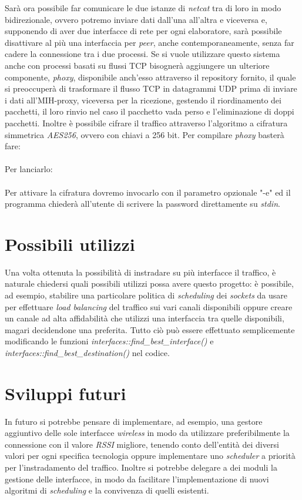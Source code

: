 Sarà ora possibile far comunicare le due istanze di {\em netcat} tra di loro in modo bidirezionale, ovvero potremo inviare dati dall'una all'altra e viceversa e, supponendo di aver due interfacce di rete per ogni elaboratore, sarà possibile disattivare al più una interfaccia per {\em peer}, anche contemporaneamente, senza far cadere la connessione tra i due processi. Se si vuole utilizzare questo sistema anche con processi basati su flussi TCP bisognerà aggiungere un ulteriore componente, {\em phoxy}, disponibile anch'esso attraverso il repository fornito, il quale si preoccuperà di trasformare il flusso TCP in datagrammi UDP prima di inviare i dati all'MIH-proxy, viceversa per la ricezione, gestendo il riordinamento dei pacchetti, il loro rinvio nel caso il pacchetto vada perso e l'eliminazione di doppi pacchetti. Inoltre è possibile cifrare il traffico attraverso l'algoritmo a cifratura simmetrica {\em AES256}, ovvero con chiavi a 256 bit. Per compilare {\em phoxy} basterà fare:\\
\\Per lanciarlo:\\
\\
Per attivare la cifratura dovremo invocarlo con il parametro opzionale "-e" ed il programma chiederà all'utente di scrivere la password direttamente su {\em stdin}.
\newpage
\section{Possibili utilizzi}
Una volta ottenuta la possibilità di instradare su più interfacce il traffico, è naturale chiedersi quali possibili utilizzi possa avere questo progetto:
è possibile, ad esempio, stabilire una particolare politica di {\em scheduling} dei {\em sockets} da usare per effettuare {\em load balancing} del traffico sui vari canali disponibili oppure creare un canale ad alta affidabilità che utilizzi una interfaccia tra quelle disponibili, magari decidendone una preferita. Tutto ciò può essere effettuato semplicemente modificando le funzioni {\em interfaces::find\_best\_interface()} e {\em interfaces::find\_best\_destination()} nel codice.
\section{Sviluppi futuri}
In futuro si potrebbe pensare di implementare, ad esempio, una gestore aggiuntivo delle sole interfacce {\em wireless} in modo da utilizzare preferibilmente la connessione con il valore {\em RSSI} migliore, tenendo conto dell'entità dei diversi valori per ogni specifica tecnologia oppure implementare uno {\em scheduler} a priorità per l'instradamento del traffico. Inoltre si potrebbe delegare a dei moduli la gestione delle interfacce, in modo da facilitare l'implementazione di nuovi algoritmi di {\em scheduling} e la convivenza di quelli esistenti.
